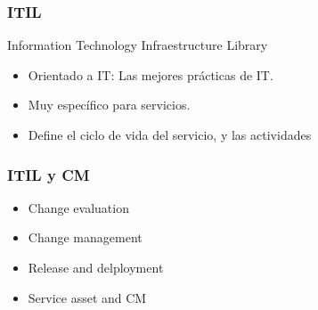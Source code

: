\begin{frame}
	\frametitle{ITIL}
	Information Technology Infraestructure Library
	\begin{itemize}
		\item Orientado a IT: Las mejores pr\'acticas de IT. 
		\item Muy espec\'ifico para servicios. 
		\item Define el ciclo de vida del servicio, y las actividades
	\end{itemize}
\end{frame}
\begin{frame}
	\frametitle{ITIL y CM}
	\begin{itemize}
		\item Change evaluation
		\item Change management
		\item Release and delployment
		\item Service asset and CM
	\end{itemize}
\end{frame}

